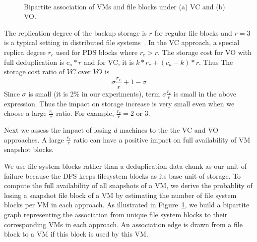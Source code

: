 \begin{figure}
    \centering
    \\
    \caption{Bipartite association of VMs and file blocks under (a) VC and (b) VO. }
    \label{fig:share}
\end{figure}

The replication degree of the backup storage 
is $r$ for regular file blocks and $r=3$ is a typical setting in distributed
file systems~\cite{googlefs03,hdfs10}.
In the VC approach, a special replica degree $r_c$ used for PDS blocks where $r_c>r$. 
The storage cost for VO with full deduplication is $c_u *r$ and for VC, it is
$ k*r_c  + (c_u-k)*r$. Thus The storage cost ratio of $VC$ over $VO$ is 
\[
\sigma \frac{r_c}{r} + 1-\sigma
\]
Since $\sigma$ is small (it is 2\% in our experiments),  
term $\sigma \frac{r_c}{r}$ is small in the above expression.  
Thus the impact on storage increase is very small even when we choose a large $\frac{r_c}{r}$ ratio. 
For example, $\frac{r_c}{r}=2$ or 3. 

Next we  assess  the impact of losing $d$ machines 
to the the VC and VO approaches.  
A large $\frac{r_c}{r}$ ratio can have a positive impact on full availability of VM snapshot blocks.

We use file system blocks rather than a deduplication
data chunk as our unit of failure because the DFS keeps
filesystem blocks as its base unit of storage.
To compute the full availability of all snapshots of a VM, we derive
the probablity of losing a snapshot file block of a VM by
estimating the number of file system blocks per VM in each approach.
As illustrated in Figure~\ref{fig:share},
we build a bipartite graph representing the association from unique file system blocks
to their corresponding VMs in each approach. An association edge is  drawn  from a file block  to a VM 
if this block is used by this VM. 

